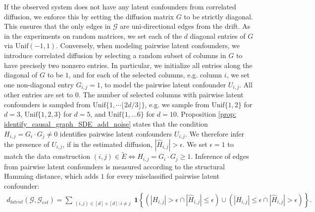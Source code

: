\documentclass[twoside,11pt]{article}
\begin{document}
If the observed system does not have any latent confounders from correlated diffusion, we enforce this by setting the diffusion matrix $G$ to be strictly diagonal. This ensures that the only edges in $\mathcal{G}$ are uni-directional edges from the drift. As in the experiments on random matrices, we set each of the $d$ diagonal entries of $G$ via $\text{Unif}(-1,1)$. Conversely, when modeling pairwise latent confounders, we introduce correlated diffusion by selecting a random subset of columns in $G$ to have precisely two nonzero entries. In particular, we  initialize all entries along the diagonal of $G$ to be $1$, and for each of the selected columns, e.g. column $i$, we set one non-diagonal entry $G_{i,j}=1$, to model the pairwise latent confounder $U_{i,j}$. All other entries are set to $0$. The number of selected columns with pairwise latent confounders is sampled from $\text{Unif}\{1, \cdots \lfloor 2d/3 \rfloor\}$, e.g. we sample from $\text{Unif}\{1, 2\}$ for $d=3$, $\text{Unif}\{1, 2, 3\}$ for $d=5$, and $\text{Unif}\{1, \dots 6\}$ for $d=10$. Proposition \ref{prop: identify_causal_graph_SDE_add_noise} states that the condition $H_{i,j} = G_i \cdot G_j \neq 0$ identifies pairwise latent confounders $U_{i,j}$. We therefore infer the presence of $U_{i,j}$, if in the estimated diffusion, $|\hat{H}_{i,j}|  > \epsilon$. We set $\epsilon=1$ to match the data construction $(i,j) \in \tilde{E} \iff H_{i,j} = G_i \cdot G_j \ge 1$. Inference of edges from pairwise latent confounders is measured according to the structural Hamming distance, which adds $1$ for every misclassified pairwise latent confounder:
\begin{align}
d_{latent}(\mathcal{G}, \mathcal{G}_{est})=
\sum_{\substack{(i, j) \in [d] \times [d]: i \neq j}} 
\mathbf{1} \left\{ (|H_{i,j}| > \epsilon \cap |\hat{H}_{i,j}| \le \epsilon) \cup (|H_{i,j}| \le \epsilon \cap |\hat{H}_{i,j}| > \epsilon) \right\}.
\label{eq: hamming_H}
\end{align}
\end{document}
